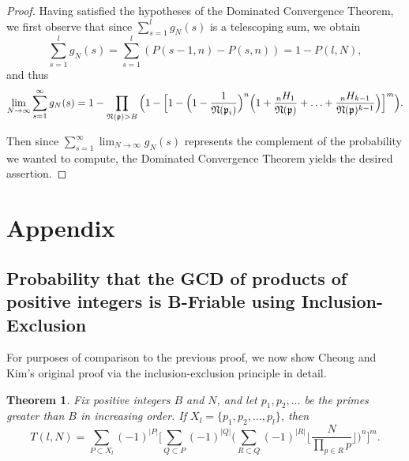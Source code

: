 \documentclass[12pt]{amsart}
\newtheorem{theorem}{Theorem}[subsection]
\theoremstyle{definition}
\newcommand{\f}[1]{\mathfrak{#1}}
\begin{document}
\begin{proof}
Having satisfied the hypotheses of the Dominated Convergence Theorem, we first observe that since $\sum_{s=1}^l g_N(s)$ is a telescoping sum, we obtain
$$\sum_{s=1}^l g_N(s) = \sum_{s=1}^l (P(s-1, n) - P(s, n)) = 1 - P(l, N),$$ 
and thus
$$\lim_{N \to \infty} \sum_{s=1}^{\infty} g_N(s) = 1 - \prod_{\f{N}(\f{p}) > B} \Big(1 - \Big[1 - \Big(1-\frac{1}{\f{N}(\f{p}_i)}\Big)^n \Big(1 + \frac{{}_nH_1}{\f{N}(\f{p})} + \mathellipsis + \frac{{}_nH_{k-1}}{\f{N}(\f{p})^{k-1}}\Big)\Big]^m\Big).$$

\noindent Then since $\displaystyle \sum_{s=1}^{\infty} \lim_{N \to \infty} g_N(s)$ represents the complement of the probability we wanted to compute, the Dominated Convergence Theorem yields the desired assertion.
\end{proof}

\section{Appendix}
\subsection{Probability that the GCD of products of positive integers is  B-Friable using Inclusion-Exclusion}
For purposes of comparison to the previous proof, we now show Cheong and Kim's original proof via the inclusion-exclusion principle in detail.
\begin{theorem}
	Fix positive integers $B$ and $N$, and let $p_1, p_2, ...$ be the primes greater than $B$ in increasing order. If $X_l = \{p_1, p_2, ..., p_l\}$, then
	$$T(l,N)=\sum_{P\subset X_l}{(-1)^{|P|}} \Bigg[\sum_{Q\subset P}(-1)^{|Q|} \Big(\sum_{R\subset Q}(-1)^{|R|}\Big\lfloor\frac{N}{\prod_{p\in R} p}\Big\rfloor\Big)^n\Bigg]^m.$$
\end{theorem}
\end{document}
